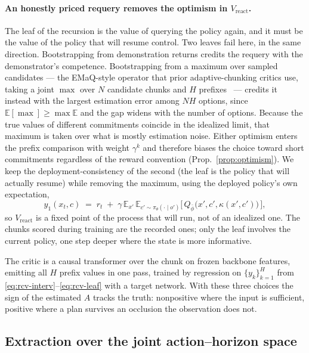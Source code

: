 \paragraph{An honestly priced requery removes the optimism in $V_{\mathrm{react}}$.}
The leaf of the recursion is the value of querying the policy again, and it must be the value of the
policy that will resume control. Two leaves fail here, in the same direction. Bootstrapping from
demonstration returns credits the requery with the demonstrator's competence. Bootstrapping from a
maximum over sampled candidates --- the EMaQ-style operator that prior adaptive-chunking critics use,
taking a joint $\max$ over $N$ candidate chunks and $H$ prefixes~\citep{acsac} --- credits it instead
with the largest estimation error among $NH$ options, since $\mathbb E[\max] \ge \max \mathbb E$ and the
gap widens with the number of options. Because the true values of different commitments coincide in the
idealized limit, that maximum is taken over what is mostly estimation noise. Either optimism enters the
prefix comparison with weight $\gamma^{k}$ and therefore biases the choice toward short commitments
regardless of the reward convention (Prop.~\ref{prop:optimism}). We keep the deployment-consistency of
the second (the leaf is the policy that will actually resume) while removing the maximum, using the
deployed policy's own expectation,
\begin{equation}
\label{eq:rcv-leaf}
y_1(x_t, c) \;=\; r_t \;+\; \gamma\, \mathbb E_{x'}\,\mathbb E_{c'\sim\pi_\theta(\cdot\mid o')}
\big[\, Q_{\bar\phi}\big(x', c', \kappa(x', c')\big) \,\big],
\end{equation}
so $V_{\mathrm{react}}$ is a fixed point of the process that will run, not of an idealized one. The
chunks scored during training are the recorded ones; only the leaf involves the current policy, one
step deeper where the state is more informative.

The critic is a causal transformer over the chunk on frozen backbone features, emitting all $H$ prefix
values in one pass, trained by regression on $\{y_k\}_{k=1}^{H}$ from
\eqref{eq:rcv-interv}--\eqref{eq:rcv-leaf} with a target network. With these three choices the sign of
the estimated $A$ tracks the truth: nonpositive where the input is sufficient, positive where a plan
survives an occlusion the observation does not.

\subsection{Extraction over the joint action--horizon space}
\label{sec:method:actor}

